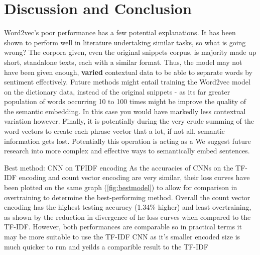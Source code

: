 \documentclass{article}
\begin{document}

\section{Discussion and Conclusion}
Word2vec's poor performance has a few potential explanations. It has been shown to perform well in literature undertaking similar tasks, so what is going wrong? The corpora given, even the original snippets corpus, is majority made up short, standalone texts, each with a similar format. Thus, the model may not have been given enough, \textbf{varied} contextual data to be able to separate words by sentiment effectively. Future methods might entail training the Word2vec model on the dictionary data, instead of the original snippets - as its far greater population of words occurring 10 to 100 times might be improve the quality of the semantic embedding. In this case you would have markedly less contextual variation however. Finally, it is potentially during the very crude summing of the word vectors to create each phrase vector that a lot, if not all, semantic information gets lost. Potentially this operation is acting as a We suggest future research into more complex and effective ways to semantically embed sentences.

Best method: CNN on TFIDF encoding 
As the accuracies of CNNs on the TF-IDF encoding and count vector encoding are very similar, their loss curves have been plotted on the same graph (\ref{fig:bestmodel}) to allow for comparison in overtraining to determine the best-performing method. Overall the count vector encoding has the highest testing accuracy (1.34\% higher) and least overtraining, as shown by the reduction in divergence of he loss curves when compared to the TF-IDF. However, both performances are comparable so in practical terms it may be more suitable to use the TF-IDF CNN as it's smaller encoded size is much quicker to run and yeilds a comparible result to the TF-IDF
\end{document}
